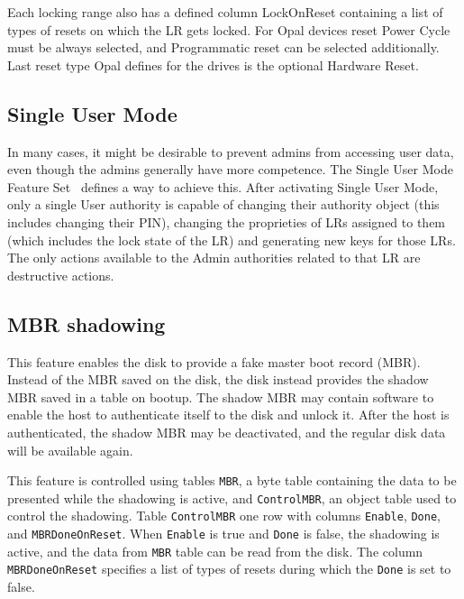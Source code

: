 Each locking range also has a defined column LockOnReset containing a list of types of resets on which the LR gets locked. 
For Opal devices reset Power Cycle must be always selected, and Programmatic reset can be selected additionally. Last reset type Opal defines for the drives is the optional Hardware Reset.

\subsection{Single User Mode}

In many cases, it might be desirable to prevent admins from accessing user data, even though the admins generally have more competence. 
The Single User Mode Feature Set~\cite{tcg-sum} defines a way to achieve this.
After activating Single User Mode, only a single User authority is capable of changing their authority object (this includes changing their PIN), changing the proprieties of LRs assigned to them (which includes the lock state of the LR) and generating new keys for those LRs.
The only actions available to the Admin authorities related to that LR are destructive actions.


\subsection{MBR shadowing}

This feature enables the disk to provide a fake master boot record (MBR). Instead of the MBR saved on the disk, the disk instead provides the shadow MBR saved in a table on bootup. The shadow MBR may contain software to enable the host to authenticate itself to the disk and unlock it. After the host is authenticated, the shadow MBR may be deactivated, and the regular disk data will be available again.

This feature is controlled using tables \verb|MBR|, a byte table containing the data to be presented while the shadowing is active, and \verb|ControlMBR|, an object table used to control the shadowing. Table \verb|ControlMBR| one row with columns \verb|Enable|, \verb|Done|, and \verb|MBRDoneOnReset|.
When \verb|Enable| is true and \verb|Done| is false, the shadowing is active, and the data from \verb|MBR| table can be read from the disk. The column \verb|MBRDoneOnReset| specifies a list of types of resets during which the \verb|Done| is set to false.

